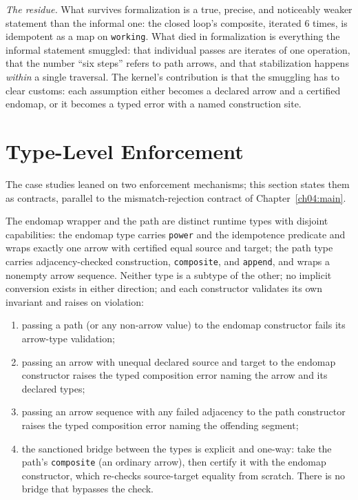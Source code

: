 \emph{The residue.} What survives formalization is a true, precise, and
noticeably weaker statement than the informal one: the closed loop's
composite, iterated $6$ times, is idempotent as a map on \texttt{working}.
What died in formalization is everything the informal statement smuggled:
that individual passes are iterates of one operation, that the number
``six steps'' refers to path arrows, and that stabilization happens
\emph{within} a single traversal. The kernel's contribution is that the
smuggling has to clear customs: each assumption either becomes a declared
arrow and a certified endomap, or it becomes a typed error with a named
construction site.

\section{Type-Level Enforcement}
\label{ch06:sec:enforcement}

The case studies leaned on two enforcement mechanisms; this section states
them as contracts, parallel to the mismatch-rejection contract of
Chapter~\ref{ch04:main}.

\begin{invariant}
\label{ch06:inv:distinct}
The endomap wrapper and the path are distinct runtime types with disjoint
capabilities: the endomap type carries \texttt{power} and the idempotence
predicate and wraps exactly one arrow with certified equal source and
target; the path type carries adjacency-checked construction,
\texttt{composite}, and \texttt{append}, and wraps a nonempty arrow
sequence. Neither type is a subtype of the other; no implicit conversion
exists in either direction; and each constructor validates its own
invariant and raises on violation:
\begin{enumerate}
\item passing a path (or any non-arrow value) to the endomap constructor
fails its arrow-type validation;
\item passing an arrow with unequal declared source and target to the
endomap constructor raises the typed composition error naming the arrow
and its declared types;
\item passing an arrow sequence with any failed adjacency to the path
constructor raises the typed composition error naming the offending
segment;
\item the sanctioned bridge between the types is explicit and one-way:
take the path's \texttt{composite} (an ordinary arrow), then certify it
with the endomap constructor, which re-checks source-target equality from
scratch. There is no bridge that bypasses the check.
\end{enumerate}
\end{invariant}


